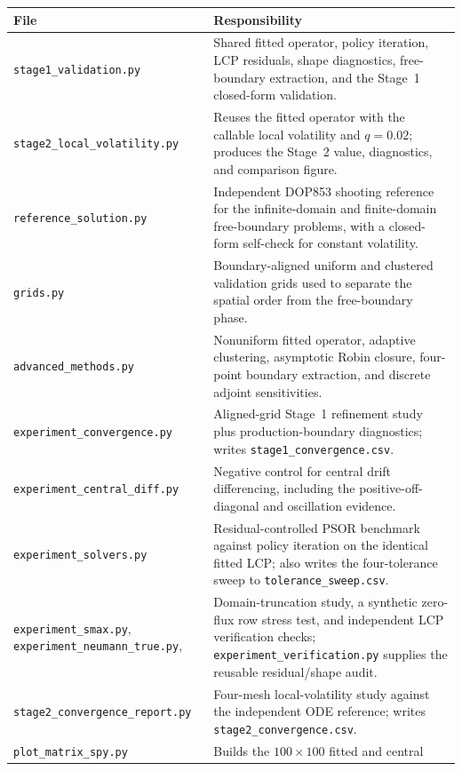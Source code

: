 \documentclass[11pt,a4paper]{article}
\theoremstyle{definition}
\theoremstyle{remark}
\begin{document}
\begin{table}[H]
\centering
\scriptsize
\setlength{\tabcolsep}{3pt}
\begin{tabular}{@{}>{\raggedright\arraybackslash}p{}>{\raggedright\arraybackslash}p{}@{}}
\toprule
\textbf{File} & \textbf{Responsibility} \\
\midrule
\texttt{stage1\_validation.py} & Shared fitted operator, policy iteration,
LCP residuals, shape diagnostics, free-boundary extraction, and the Stage~1
closed-form validation. \\
\texttt{stage2\_local\_volatility.py} & Reuses the fitted operator with the
callable local volatility and $q=0.02$; produces the Stage~2 value,
diagnostics, and comparison figure. \\
\texttt{reference\_solution.py} & Independent DOP853 shooting reference for
the infinite-domain and finite-domain free-boundary problems, with a
closed-form self-check for constant volatility. \\
\texttt{grids.py} & Boundary-aligned uniform and clustered validation grids
used to separate the spatial order from the free-boundary phase. \\
\texttt{advanced\_methods.py} & Nonuniform fitted operator, adaptive
clustering, asymptotic Robin closure, four-point boundary extraction, and
discrete adjoint sensitivities. \\
\texttt{experiment\_convergence.py} & Aligned-grid Stage~1 refinement study
plus production-boundary diagnostics; writes
\texttt{stage1\_convergence.csv}. \\
\texttt{experiment\_central\_diff.py} & Negative control for central drift
differencing, including the positive-off-diagonal and oscillation evidence. \\
\texttt{experiment\_solvers.py} & Residual-controlled PSOR benchmark against
policy iteration on the identical fitted LCP; also writes the four-tolerance
sweep to \texttt{tolerance\_sweep.csv}. \\
\texttt{experiment\_smax.py}, \texttt{experiment\_neumann\_true.py}, &
Domain-truncation study, a synthetic zero-flux row stress test, and
independent LCP verification checks; \texttt{experiment\_verification.py}
supplies the reusable residual/shape audit. \\
\texttt{stage2\_convergence\_report.py} & Four-mesh local-volatility study
against the independent ODE reference; writes
\texttt{stage2\_convergence.csv}. \\
\texttt{plot\_matrix\_spy.py} & Builds the $100\times100$ fitted and central

\end{tabular}
\end{table}
\end{document}
